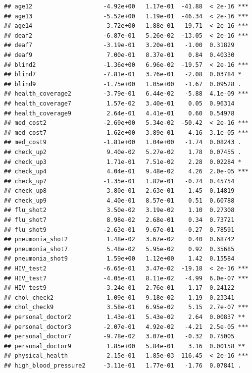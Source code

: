 \documentclass[
]{article}
\begin{document}
\begin{verbatim}
## age12                    -4.92e+00   1.17e-01  -41.88  < 2e-16 ***
## age13                    -5.52e+00   1.19e-01  -46.34  < 2e-16 ***
## age14                    -3.72e+00   1.88e-01  -19.71  < 2e-16 ***
## deaf2                    -6.87e-01   5.26e-02  -13.05  < 2e-16 ***
## deaf7                    -3.19e-01   3.20e-01   -1.00  0.31829    
## deaf9                     7.00e-01   8.37e-01    0.84  0.40330    
## blind2                   -1.36e+00   6.96e-02  -19.57  < 2e-16 ***
## blind7                   -7.81e-01   3.76e-01   -2.08  0.03784 *  
## blind9                   -1.75e+00   1.05e+00   -1.67  0.09528 .  
## health_coverage2         -3.79e-01   6.44e-02   -5.88  4.1e-09 ***
## health_coverage7          1.57e-02   3.40e-01    0.05  0.96314    
## health_coverage9          2.64e-01   4.41e-01    0.60  0.54978    
## med_cost2                -2.69e+00   5.34e-02  -50.42  < 2e-16 ***
## med_cost7                -1.62e+00   3.89e-01   -4.16  3.1e-05 ***
## med_cost9                -1.81e+00   1.04e+00   -1.74  0.08243 .  
## check_up2                 9.40e-02   5.27e-02    1.78  0.07455 .  
## check_up3                 1.71e-01   7.51e-02    2.28  0.02284 *  
## check_up4                 4.04e-01   9.48e-02    4.26  2.0e-05 ***
## check_up7                -1.35e-01   1.82e-01   -0.74  0.45754    
## check_up8                 3.80e-01   2.63e-01    1.45  0.14819    
## check_up9                 4.40e-01   8.57e-01    0.51  0.60788    
## flu_shot2                 3.50e-02   3.19e-02    1.10  0.27308    
## flu_shot7                 8.98e-02   2.68e-01    0.34  0.73721    
## flu_shot9                -2.63e-01   9.67e-01   -0.27  0.78591    
## pneumonia_shot2           1.48e-02   3.67e-02    0.40  0.68742    
## pneumonia_shot7           5.48e-02   5.95e-02    0.92  0.35685    
## pneumonia_shot9           1.59e+00   1.12e+00    1.42  0.15584    
## HIV_test2                -6.65e-01   3.47e-02  -19.18  < 2e-16 ***
## HIV_test7                -4.05e-01   8.11e-02   -4.99  6.0e-07 ***
## HIV_test9                -3.24e-01   2.76e-01   -1.17  0.24122    
## chol_check2               1.09e-01   9.18e-02    1.19  0.23341    
## chol_check9               3.58e-01   6.95e-02    5.15  2.7e-07 ***
## personal_doctor2          1.43e-01   5.43e-02    2.64  0.00837 ** 
## personal_doctor3         -2.07e-01   4.92e-02   -4.21  2.5e-05 ***
## personal_doctor7         -9.78e-02   3.07e-01   -0.32  0.75005    
## personal_doctor9          1.85e+00   5.84e-01    3.16  0.00158 ** 
## physical_health           2.15e-01   1.85e-03  116.45  < 2e-16 ***
## high_blood_pressure2     -3.11e-01   1.77e-01   -1.76  0.07841 .  

\end{verbatim}
\end{document}
